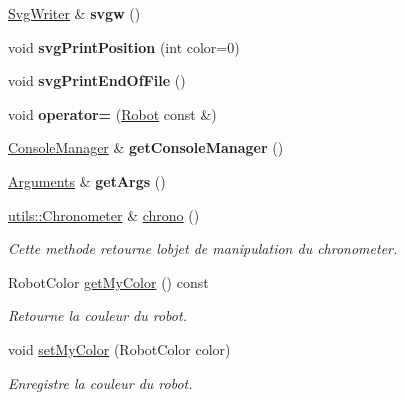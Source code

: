 \begin{DoxyCompactItemize}
\hyperlink{classSvgWriter}{Svg\+Writer} \& {\bfseries svgw} ()
\item 
\mbox{\label{classRobot_ade84d9257e194f8b04cc9f5f97e184da}} 
void {\bfseries svg\+Print\+Position} (int color=0)
\item 
\mbox{\label{classRobot_a769fd661366307a701f22d3f7904ded0}} 
void {\bfseries svg\+Print\+End\+Of\+File} ()
\item 
\mbox{\label{classRobot_a67336ca8d883c9de82d8963220c6ca8e}} 
void {\bfseries operator=} (\hyperlink{classRobot}{Robot} const \&)
\item 
\mbox{\label{classRobot_a069902d2b940a23e00453ec6511b2ecb}} 
\hyperlink{classConsoleManager}{Console\+Manager} \& {\bfseries get\+Console\+Manager} ()
\item 
\mbox{\label{classRobot_aff7fd21568740625c8494d3fb5e9f34a}} 
\hyperlink{classArguments}{Arguments} \& {\bfseries get\+Args} ()
\item 
\hyperlink{classutils_1_1Chronometer}{utils\+::\+Chronometer} \& \hyperlink{classRobot_a7af430452b558088757324f857d099b2}{chrono} ()
\begin{DoxyCompactList}\small\item\em Cette methode retourne l\textquotesingle{}objet de manipulation du chronometer. \end{DoxyCompactList}\item 
\mbox{\label{classRobot_a99ab62d38fe4737043969290b278cd15}} 
Robot\+Color \hyperlink{classRobot_a99ab62d38fe4737043969290b278cd15}{get\+My\+Color} () const
\begin{DoxyCompactList}\small\item\em Retourne la couleur du robot. \end{DoxyCompactList}\item 
\mbox{\label{classRobot_a641f6a9269152cc48be814827d71ee37}} 
void \hyperlink{classRobot_a641f6a9269152cc48be814827d71ee37}{set\+My\+Color} (Robot\+Color color)
\begin{DoxyCompactList}\small\item\em Enregistre la couleur du robot. \end{DoxyCompactList}\item 

\end{DoxyCompactItemize}
